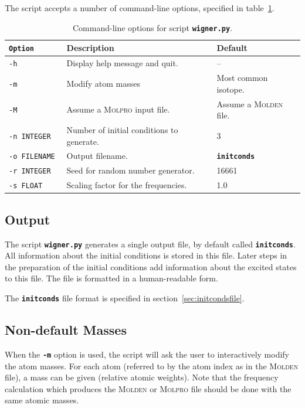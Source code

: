 \documentclass[a4paper,11pt,DIV=15,openany,twoside=false]{scrbook}
\newcommand{\ttt}[1]{\textbf{\texttt{#1}}}
\begin{document}
The script accepts a number of command-line options, specified in table~\ref{tab:wigner_opts}.
\begin{table}
  \centering
  \caption{Command-line options for script \ttt{wigner.py}.}
  \label{tab:wigner_opts}
  \begin{tabular}{>{\tt}lll}
    \toprule
    \rmfamily Option        &Description      &Default\\
    \midrule
    -h                  &Display help message and quit.             & --                             \\
    -m                  &Modify atom masses                         &Most common isotope.           \\
    -M                  &Assume a \textsc{Molpro} input file.       &Assume a \textsc{Molden} file. \\
    -n  INTEGER         &Number of initial conditions to generate.  &3                              \\
    -o  FILENAME        &Output filename.                           &\ttt{initconds}                \\
    -r  INTEGER         &Seed for random number generator.          &16661                          \\
    -s  FLOAT           &Scaling factor for the frequencies.        &1.0                            \\
    \bottomrule
  \end{tabular}
\end{table}

\subsection{Output}

The script \ttt{wigner.py} generates a single output file, by default called \ttt{initconds}. All information about the initial conditions is stored in this file. Later steps in the preparation of the initial conditions add information about the excited states to this file. The file is formatted in a human-readable form.

The \ttt{initconds} file format is specified in section~\ref{sec:initcondsfile}.

\subsection{Non-default Masses}

When the \ttt{-m} option is used, the script will ask the user to interactively modify the atom masses. For each atom (referred to by the atom index as in the \textsc{Molden} file), a mass can be given (relative atomic weights). Note that the frequency calculation which produces the \textsc{Molden} or \textsc{Molpro} file should be done with the same atomic masses.
\end{document}
